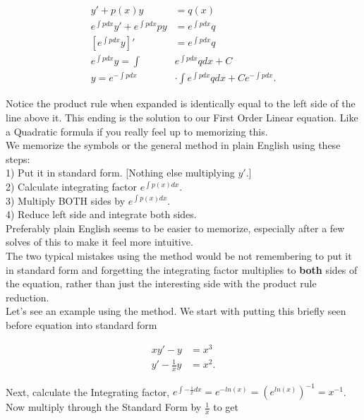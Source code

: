 \documentclass[12pt]{article}
\begin{document}
\begin{align*}
    y'+p(x)y &= q(x) \\
    e^{\int p dx}y'+ e^{\int p dx}py &= e^{\int p dx}q \\
    [e^{\int p dx}y]' &= e^{\int p dx}q \\
    e^{\int p dx}y = \int & e^{\int p dx}q dx + C \\
    y = e^{- \int p dx}& \cdot \int e^{\int p dx}q dx + C e^{- \int p dx}.
\end{align*}

Notice the product rule when expanded is identically equal to the left side of the line above it. This ending is the solution to our First Order Linear equation. Like a Quadratic formula if you really feel up to memorizing this. \\ 

We memorize the symbols or the general method in plain English using these steps: \\

1) Put it in standard form. [Nothing else multiplying $y'$.] \\

2) Calculate integrating factor $e^{\int p(x) dx}$. \\

3) Multiply BOTH sides by $e^{\int p(x) dx}$. \\

4) Reduce left side and integrate both sides. \\

Preferably plain English seems to be easier to memorize, especially after a few solves of this to make it feel more intuitive. \\

The two typical mistakes using the method would be not remembering to put it in standard form and forgetting the integrating factor multiplies to \textbf{both} sides of the equation, rather than just the interesting side with the product rule reduction. \\

Let's see an example using the method. We start with putting this briefly seen before equation into standard form

\begin{align*}
    xy'-y &= x^3 \\
    y' - \frac{1}{x}y &= x^2.
\end{align*}

Next, calculate the Integrating factor, $e^{\int -\frac{1}{x} dx} = e^{-ln(x)} = \left(e^{ln(x)}\right)^{-1} = x^{-1}$. Now multiply through the Standard Form by $\frac{1}{x}$ to get
\end{document}
